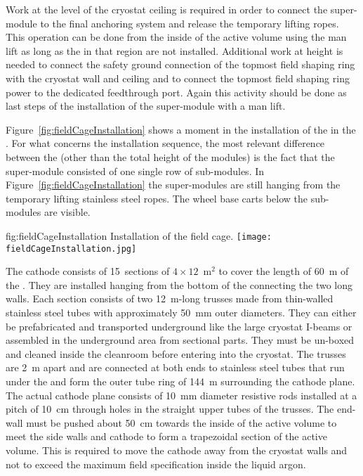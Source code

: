 Work at the level of the cryostat ceiling is required in order to connect the super-module to the final anchoring system and release the temporary lifting ropes.
This operation can be done from the inside of the active volume using the man lift as long as the  in that region are not installed.
Additional work at height is needed to connect the safety ground connection of the topmost field shaping ring with the cryostat wall and ceiling and to connect the topmost field shaping ring power to the dedicated feedthrough port.
Again this activity should be done as last steps of the installation of the super-module with a man lift.

Figure~\ref{fig:fieldCageInstallation} shows a moment in the installation of the  in the .
For what concerns the installation sequence, the most relevant difference between the  (other than the total height of the modules) is the fact that the super-module consisted of one single row of sub-modules.
In Figure~\ref{fig:fieldCageInstallation} the super-modules are still hanging from the temporary lifting stainless steel ropes.
The wheel base carts below the sub-modules are visible.
\begin{dunefigure}{fig:fieldCageInstallation}
{Installation of the  field cage.}
\texttt{[image: fieldCageInstallation.jpg]}
\end{dunefigure}

The cathode consists of 15~sections of $4 \times 12$~m$^2$ to cover the length of 60~m of the  .
They are installed hanging from the bottom of the  connecting the two long walls.
Each section consists of two 12~m-long trusses made from thin-walled stainless steel tubes with approximately 50~mm outer diameters.
They can either be prefabricated and transported underground like the large cryostat I-beams or assembled in the underground area from sectional parts.
They must be un-boxed and cleaned inside the cleanroom before entering into the cryostat.
The trusses are 2~m apart and are connected at both ends to stainless steel tubes that run under the  and form the outer tube ring of 144~m surrounding the cathode plane.
The actual cathode plane consists of 10~mm diameter resistive rods installed at a pitch of 10~cm through holes in the straight upper tubes of the trusses.
The  end-wall must be pushed about 50~cm towards the inside of the active volume to meet the  side walls and cathode to form a trapezoidal section of the active volume.
This is required to move the cathode away from the cryostat walls and not to exceed the maximum field specification inside the liquid argon.

